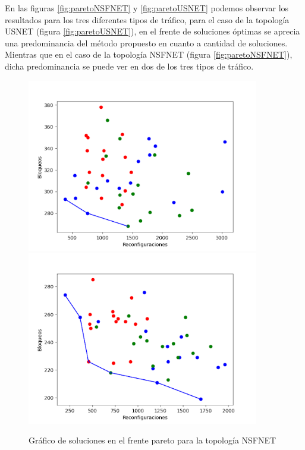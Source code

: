 \begin{itemize}
 En las figuras \ref{fig:paretoNSFNET} y \ref{fig:paretoUSNET} podemos observar los resultados para los tres diferentes tipos de tráfico, para el caso de la topología USNET (figura \ref{fig:paretoUSNET}), en el frente de soluciones óptimas se aprecia una predominancia del método propuesto en cuanto a cantidad de soluciones. Mientras que en el caso de la topología NSFNET  (figura \ref{fig:paretoNSFNET}), dicha predominancia se puede ver en dos de los tres tipos de tráfico.
 \newpage
 
 \begin{figure}[H]
    \centering
    \includegraphics[width=0.9\textwidth]{capitulos/img/nsfnet_pareto_1.png}
    \includegraphics[width=0.9\textwidth]{capitulos/img/nsfnet_pareto_2.png}
    \caption{Gráfico de soluciones en el frente pareto para la topología NSFNET}
 \end{figure}


\end{itemize}
